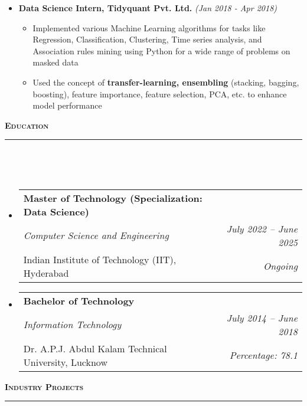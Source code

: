 \documentclass[a4paper,10pt]{article}
\makeatletter
\newcommand{\isep}{-2 pt}
\newcommand{\lsep}{-0.5cm}
\newcommand{\resheading}[1]{{\small
        {
            \begin{minipage}
                {0.992\textwidth}\textbf{{\textsc{#1 \vphantom{p\^{E}} }}}
                \\[-0.3cm]
                \hrule
            \end{minipage}
            \\[-0.5cm]
        }
 }}
\newcommand{\resEduHeading}[6]{
  \begin{tabular*}{7.1in}{l @{\extracolsep{\fill}} r}
    \textbf{\normalsize #1} \\
    \textit{#2} & \textit{#3} \\
    {\normalsize #4} & \textit{{#5} \textbf{#6}}
  \end{tabular*}
}
\makeatother
\begin{document}
\begin{itemize}
    \item \textbf{Data Science Intern, Tidyquant Pvt. Ltd.} \hfill {\emph{(Jan 2018 - Apr 2018)}}
    \\ [-0.6cm]
    \begin{itemize}\itemsep \isep
        \item Implemented various Machine Learning algorithms for tasks like Regression, Classification, Clustering, Time series analysis, and Association rules mining using Python for a wide range of problems on masked data 
        \item Used the concept of \textbf{transfer-learning, ensembling} (stacking, bagging, boosting), feature importance, feature selection, PCA, etc. to enhance model performance 
    \\ [-0.5cm]
    \end{itemize}
\end{itemize}
\vspace{2pt}
\noindent
\resheading{\textbf{\large Education}}\\[\lsep]
\vspace{8pt}
\begin{itemize}
    \item \resEduHeading{Master of Technology (Specialization: Data Science)}
    {Computer Science and Engineering}
    {July 2022 -- June 2025}
    {Indian Institute of Technology (IIT), Hyderabad}
    {Ongoing}
    {}
    \item \resEduHeading{Bachelor of Technology}
    {Information Technology}
    {July 2014 -- June 2018}
    {Dr. A.P.J. Abdul Kalam Technical University, Lucknow}
    {Percentage: 78.1}
    {}
\end{itemize}
\vspace{2pt}
\noindent
\resheading{\textbf{\large Industry Projects}}\\[\lsep] 
\end{document}
